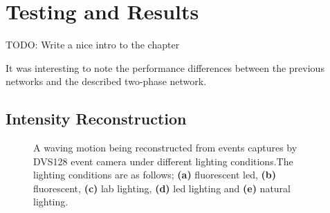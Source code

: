\chapter{Testing and Results} \label{chap:testing_and_results}

\color{red} TODO: Write a nice intro to the chapter \color{black}

It was interesting to note the performance differences between the previous networks and the described two-phase network.

\section{Intensity Reconstruction}

\begin{figure}[htb]%
    \centering
    \qquad
    \qquad
    \qquad
    \qquad
    \caption{A waving motion being reconstructed from events captures by DVS128 event camera under different lighting conditions.The lighting conditions are as follows; \textbf{(a)} fluorescent led, \textbf{(b)} fluorescent, \textbf{(c)} lab lighting, \textbf{(d)} led lighting and \textbf{(e)} natural lighting.}%
    \label{fig:wave_in_lightings_reconstructions}%
\end{figure}

